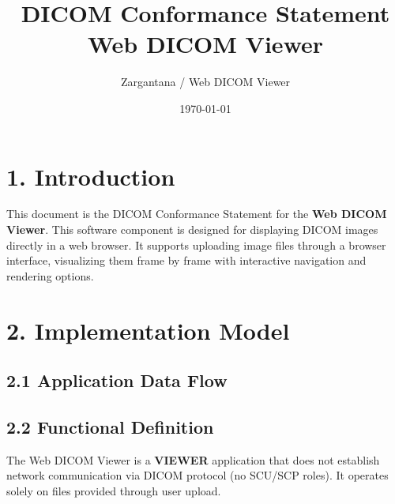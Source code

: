 \documentclass[11pt]{article}
\title{DICOM Conformance Statement \\ Web DICOM Viewer}
\author{Zargantana / Web DICOM Viewer}
\date{\today}
\begin{document}
\sloppy %

\maketitle

\section*{1. Introduction}

This document is the DICOM Conformance Statement for the \textbf{Web DICOM Viewer}. This software component is designed for displaying DICOM images directly in a web browser. It supports uploading image files through a browser interface, visualizing them frame by frame with interactive navigation and rendering options.

\section*{2. Implementation Model}

\subsection*{2.1 Application Data Flow}

\begin{center}
\end{center}

\subsection*{2.2 Functional Definition}
The Web DICOM Viewer is a \textbf{VIEWER} application that does not establish network communication via DICOM protocol (no SCU/SCP roles). It operates solely on files provided through user upload.
\end{document}
